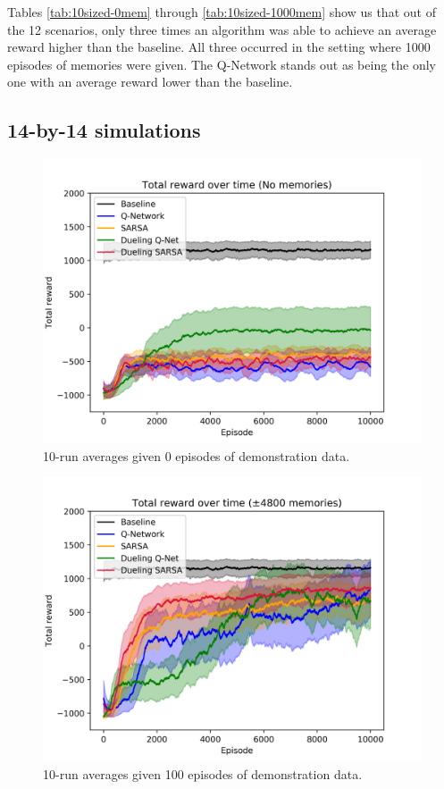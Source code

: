 Tables \ref{tab:10sized-0mem} through \ref{tab:10sized-1000mem} show us that out of the 12 scenarios, only three times an algorithm was able to achieve an average reward higher than the baseline. All three occurred in the setting where 1000 episodes of memories were given. The Q-Network stands out as being the only one with an average reward lower than the baseline.




\subsection{14-by-14 simulations}
\begin{figure}[H]
    \centering
    \includegraphics[width=\linewidth]{img/results/14-sized/total_rewards_0m-min.png}
    \caption{10-run averages given 0 episodes of demonstration data.}
    \label{fig:14sized-0mem}
\end{figure}
\begin{figure}[H]
    \centering
    \includegraphics[width=\linewidth]{img/results/14-sized/total_rewards_100m-min.png}
    \caption{10-run averages given 100 episodes of demonstration data.}
    \label{fig:14sized-100mem}
\end{figure}
